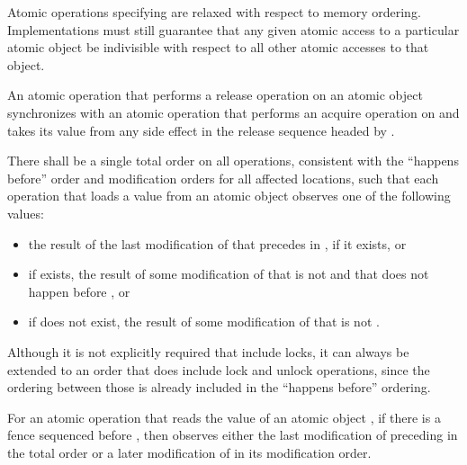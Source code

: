 \begin{note} Atomic operations specifying  are relaxed
with respect to memory ordering. Implementations must still guarantee that any
given atomic access to a particular atomic object be indivisible with respect
to all other atomic accesses to that object. \end{note}

\pnum
An atomic operation  that performs a release operation on an atomic
object  synchronizes with an atomic operation  that performs
an acquire operation on  and takes its value from any side effect in the
release sequence headed by .

\pnum
There shall be a single total order  on all 
operations, consistent with the ``happens before'' order and modification orders for all
affected locations, such that each  operation
 that loads a
value from an atomic object 
observes one of the following values:

\begin{itemize}
\item the result of the last modification  of  that precedes
 in , if it exists, or

\item if  exists, the result of some modification of 
that is not
 and that does not happen before , or

\item if  does not exist, the result of some modification of 
that is not
.
\end{itemize}

\begin{note} Although it is not explicitly required that  include locks, it can
always be extended to an order that does include lock and unlock operations, since the
ordering between those is already included in the ``happens before'' ordering. \end{note}

\pnum
For an atomic operation  that reads the value of an atomic object ,
if there is a  fence  sequenced before ,
then  observes either the last  modification of
 preceding  in the total order  or a later modification of
 in its modification order.


